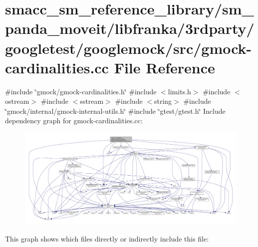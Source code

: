 \hypertarget{gmock-cardinalities_8cc}{}\section{smacc\+\_\+sm\+\_\+reference\+\_\+library/sm\+\_\+panda\+\_\+moveit/libfranka/3rdparty/googletest/googlemock/src/gmock-\/cardinalities.cc File Reference}
\label{gmock-cardinalities_8cc}
{\ttfamily \#include \char`\"{}gmock/gmock-\/cardinalities.\+h\char`\"{}}\newline
{\ttfamily \#include $<$limits.\+h$>$}\newline
{\ttfamily \#include $<$ostream$>$}\newline
{\ttfamily \#include $<$sstream$>$}\newline
{\ttfamily \#include $<$string$>$}\newline
{\ttfamily \#include \char`\"{}gmock/internal/gmock-\/internal-\/utils.\+h\char`\"{}}\newline
{\ttfamily \#include \char`\"{}gtest/gtest.\+h\char`\"{}}\newline
Include dependency graph for gmock-\/cardinalities.cc\+:
\nopagebreak
\begin{figure}[H]
\begin{center}
\leavevmode
\includegraphics[width=350pt]{gmock-cardinalities_8cc__incl}
\end{center}
\end{figure}
This graph shows which files directly or indirectly include this file\+:
\nopagebreak
